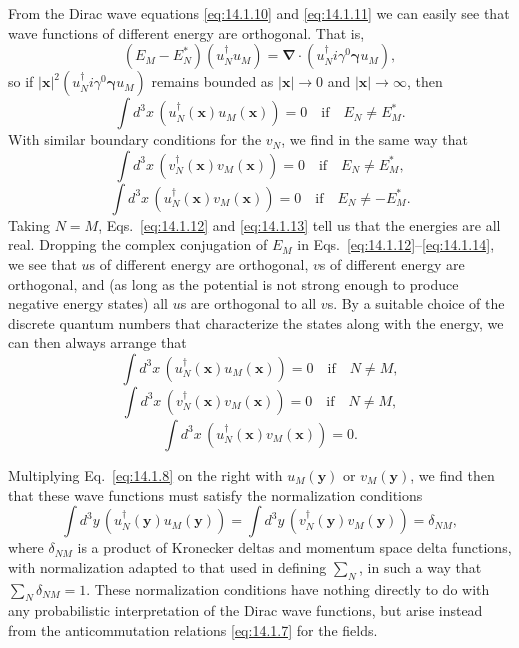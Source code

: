 From the Dirac wave equations \eqref{eq:14.1.10} and \eqref{eq:14.1.11} we can
easily see that wave functions of different energy are orthogonal. That is,
\[
  (E_M-E_N^*)(u_N^\dagger u_M)
  =\boldsymbol\nabla\cdot(u_N^\dagger i\gamma^0\boldsymbol\gamma u_M),
\]
so if $|\mathbf x|^2(u_N^\dagger i\gamma^0\boldsymbol\gamma u_M)$ remains
bounded as $|\mathbf x|\to0$ and $|\mathbf x|\to\infty$, then
\begin{equation}
  \int d^3x\,(u_N^\dagger(\mathbf x)u_M(\mathbf x))=0
  \quad\text{if}\quad E_N\ne E_M^*.
  \tag{14.1.12}\label{eq:14.1.12}
\end{equation}
With similar boundary conditions for the $v_N$, we find in the same way that
\begin{equation}
  \int d^3x\,(v_N^\dagger(\mathbf x)v_M(\mathbf x))=0
  \quad\text{if}\quad E_N\ne E_M^*,
  \tag{14.1.13}\label{eq:14.1.13}
\end{equation}
\begin{equation}
  \int d^3x\,(u_N^\dagger(\mathbf x)v_M(\mathbf x))=0
  \quad\text{if}\quad E_N\ne-E_M^*.
  \tag{14.1.14}\label{eq:14.1.14}
\end{equation}
Taking $N=M$, Eqs.~\eqref{eq:14.1.12} and \eqref{eq:14.1.13} tell us that the
energies are all real. Dropping the complex conjugation of $E_M$ in
Eqs.~\eqref{eq:14.1.12}--\eqref{eq:14.1.14}, we see that $u$s of different
energy are orthogonal, $v$s of different energy are orthogonal, and (as long
as the potential is not strong enough to produce negative energy states) all
$u$s are orthogonal to all $v$s. By a suitable choice of the discrete quantum
numbers that characterize the states along with the energy, we can then always
arrange that
\begin{equation}
  \int d^3x\,(u_N^\dagger(\mathbf x)u_M(\mathbf x))=0\quad\text{if}\quad N\ne M,
  \tag{14.1.15}\label{eq:14.1.15}
\end{equation}
\begin{equation}
  \int d^3x\,(v_N^\dagger(\mathbf x)v_M(\mathbf x))=0\quad\text{if}\quad N\ne M,
  \tag{14.1.16}\label{eq:14.1.16}
\end{equation}
\begin{equation}
  \int d^3x\,(u_N^\dagger(\mathbf x)v_M(\mathbf x))=0.
  \tag{14.1.17}\label{eq:14.1.17}
\end{equation}

Multiplying Eq.~\eqref{eq:14.1.8} on the right with $u_M(\mathbf y)$ or
$v_M(\mathbf y)$, we find then that these wave functions must satisfy the
normalization conditions
\begin{equation}
  \int d^3y\,(u_N^\dagger(\mathbf y)u_M(\mathbf y))
  =\int d^3y\,(v_N^\dagger(\mathbf y)v_M(\mathbf y))=\delta_{NM},
  \tag{14.1.18}\label{eq:14.1.18}
\end{equation}
where $\delta_{NM}$ is a product of Kronecker deltas and momentum space delta
functions, with normalization adapted to that used in defining $\sum_N$, in
such a way that $\sum_N\delta_{NM}=1$. These normalization conditions have
nothing directly to do with any probabilistic interpretation of the Dirac wave
functions, but arise instead from the anticommutation relations
\eqref{eq:14.1.7} for the fields.

